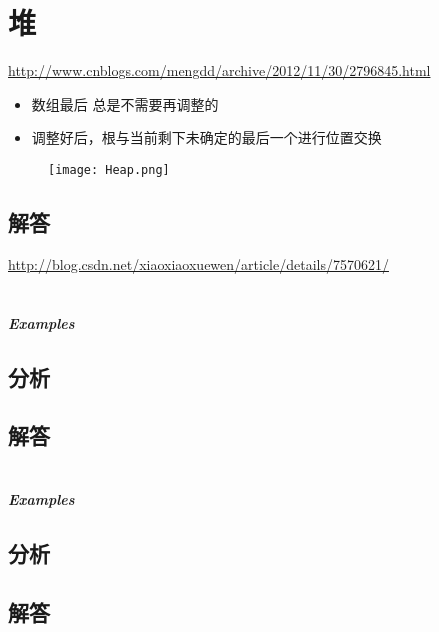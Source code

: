 \documentclass[UTF8,a4paper,12pt]{ctexbook}
\begin{document}
\section{堆}
	\url{http://www.cnblogs.com/mengdd/archive/2012/11/30/2796845.html}
	
		\begin{itemize}
			\item  数组最后 总是不需要再调整的
			\item  调整好后，根与当前剩下未确定的最后一个进行位置交换
		\end{itemize}
	
		\begin{figure}[h]
			\centering
			\texttt{[image: Heap.png]}
		\end{figure}
	\subsection{解答}
	
	\url{http://blog.csdn.net/xiaoxiaoxuewen/article/details/7570621/}
	
\section{}
	
	\subparagraph{Examples}
	
	\subsection{分析}
	
	\subsection{解答}
	
\section{}
	
	\subparagraph{Examples}
	
	\subsection{分析}
	
	\subsection{解答}
	
	
\section{}
	
\end{document}
